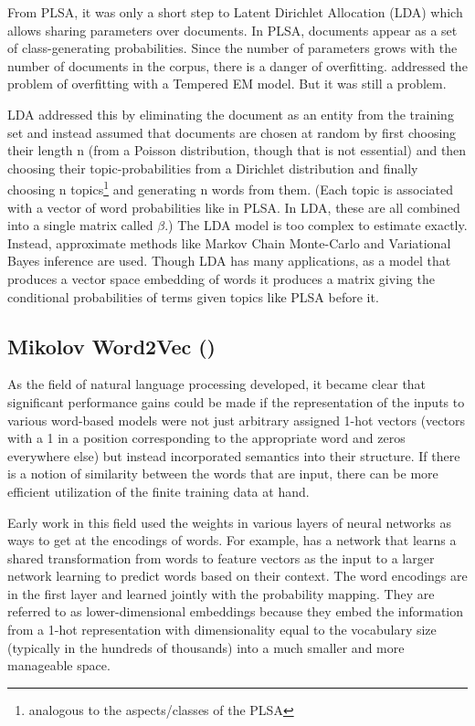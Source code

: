 From PLSA, it was only a short step to Latent Dirichlet Allocation (LDA) which 
allows sharing parameters over documents. In PLSA, documents appear as a set of 
class-generating probabilities. Since the number of parameters grows with the 
number of documents in the corpus, there is a danger of overfitting. 
\citep{Hofmann1999} addressed the problem of overfitting with a Tempered EM 
model. But it was still a problem.

LDA addressed this by eliminating the document as an entity from the training
set and instead assumed that documents are chosen at random by first choosing
their length n (from a Poisson distribution, though that is not essential) and
then choosing their topic-probabilities from a Dirichlet distribution and
finally choosing n topics\footnote{analogous to the aspects/classes of the PLSA}
and generating n words from them. (Each topic is
associated with a vector of word probabilities like in PLSA. In LDA, these are
all combined into a single matrix called $\beta$.)
\citep{Blei2003} The LDA model is too complex to estimate exactly. Instead, 
approximate methods like Markov Chain Monte-Carlo and Variational Bayes 
inference are used. Though LDA has many applications, as a model that
produces a vector space embedding of words it produces
a matrix giving the conditional probabilities of terms given topics like PLSA 
before it.

\subsection{Mikolov Word2Vec (\modelname{})}

As the field of natural language processing developed, it became clear that 
significant performance gains could be made if the representation of the inputs
to various word-based models were not just arbitrary assigned 1-hot vectors
(vectors with a 1 in a position corresponding to the appropriate word and zeros
everywhere else) but instead incorporated semantics into their structure. 
If there is a notion of similarity between the words that are input, there can 
be more efficient utilization of the finite training data at hand.

Early work in this field used the weights in various layers of neural networks
as ways to get at the encodings of words. For example, \citep{Bengio2003} has
a network that learns a shared transformation from words to feature vectors 
as the input to a larger network learning to predict words based on their 
context. The word encodings are in the first layer and learned jointly with
the probability mapping. They are referred to as lower-dimensional embeddings
because they embed the information from a 1-hot representation with 
dimensionality equal to the vocabulary size (typically in the hundreds of 
thousands) into a much smaller and more manageable space.

